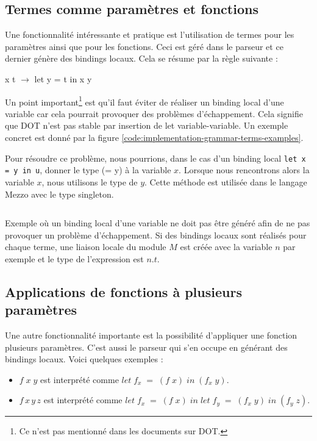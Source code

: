 \subsection*{Termes comme paramètres et fonctions}

Une fonctionnalité intéressante et pratique est l'utilisation de
termes pour les paramètres ainsi que pour les fonctions. Ceci
est géré dans le parseur et ce dernier génère des bindings locaux. Cela se
résume par la règle suivante :

\begin{center}
  x t $\rightarrow$ let y = t in x y
\end{center}

Un point important\footnote{Ce n'est pas mentionné dans les documents sur
DOT.} est qu'il faut éviter de réaliser un binding local d'une variable car
cela pourrait provoquer des problèmes d'échappement. Cela signifie que DOT n'est
pas stable par insertion de let variable-variable. Un exemple concret est donné
par la figure \ref{code:implementation-grammar-terms-examples}.

Pour résoudre ce problème, nous pourrions, dans le cas d'un binding local
\verb|let x = y in u|, donner le type (= y) à la variable $x$. Lorsque nous
rencontrons alors la variable $x$, nous utilisons le type de $y$. Cette méthode
est utilisée dans le langage Mezzo\cite{} avec le type singleton.

\begin{listing}
  \inputminted{OCaml}{codes/terms_binding_variable.rml}
  \caption{Exemple où un binding local d'une variable ne doit pas être généré
    afin de ne pas provoquer un problème d'échappement. Si des bindings locaux
    sont réalisés pour chaque terme, une liaison locale du module $M$ est
    créée avec la variable $n$ par exemple et le type de l'expression est $n.t$.}
  \label{code:implementation-grammar-terms-examples}
\end{listing}

\subsection*{Applications de fonctions à plusieurs paramètres}

Une autre fonctionnalité importante est la possibilité d'appliquer une fonction plusieurs
paramètres. C'est aussi le parseur qui s'en occupe en générant
des bindings locaux. Voici quelques exemples :

\begin{itemize}
\item $f \; x \; y$ est interprété comme $let \; f_{x} \; = \; (f \; x) \; in \;
  (f_{x} \; y)$.
\item $f \,  x \, y \, z$ est interprété comme $let \; f_{x} \; = \; (f \; x) \;
  in \; let \; f_{y} \; = \; (f_{x} \; y) \; in \; (f_{y} \; z)$.
\end{itemize}

